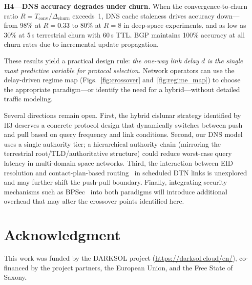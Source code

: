 \documentclass[journal,twocolumn]{IEEEtran}
\begin{document}
\textbf{H4---DNS accuracy degrades under churn.} When the convergence-to-churn ratio $R = T_{\text{conv}} / \Delta_{\text{churn}}$ exceeds~1, DNS cache staleness drives accuracy down---from 98\% at $R = 0.33$ to 80\% at $R = 8$ in deep-space experiments, and as low as 30\% at 5\,s terrestrial churn with 60\,s TTL. BGP maintains 100\% accuracy at all churn rates due to incremental update propagation.

These results yield a practical design rule: \emph{the one-way link delay $d$ is the single most predictive variable for protocol selection.} Network operators can use the delay-driven regime map (Figs.~\ref{fig:crossover} and~\ref{fig:regime_map}) to choose the appropriate paradigm---or identify the need for a hybrid---without detailed traffic modeling.

Several directions remain open. First, the hybrid cislunar strategy identified by H3 deserves a concrete protocol design that dynamically switches between push and pull based on query frequency and link conditions. Second, our DNS model uses a single authority tier; a hierarchical authority chain (mirroring the terrestrial root/TLD/authoritative structure) could reduce worst-case query latency in multi-domain space networks. Third, the interaction between EID resolution and contact-plan-based routing~\cite{araniti2015contact} in scheduled DTN links is unexplored and may further shift the push-pull boundary. Finally, integrating security mechanisms such as BPSec~\cite{rfc9172} into both paradigms will introduce additional overhead that may alter the crossover points identified here.

\section*{Acknowledgment}

This work was funded by the DARKSOL project (\url{https://darksol.cloud/en/}), co-financed by the project partners, the European Union, and the Free State of Saxony.



\end{document}

